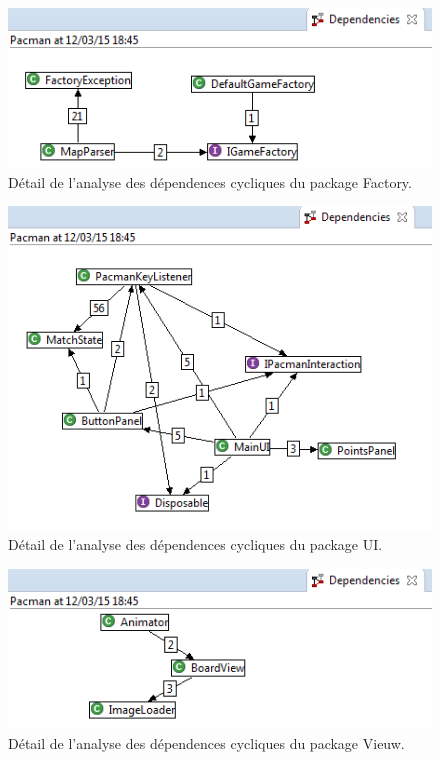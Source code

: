 \documentclass[12pt,a4paper,final]{article}
\begin{document}
\begin{figure}[ht]
	\centering
	\includegraphics[width=\textwidth]{images/DependenciesFactory.png}
	\caption{\label{dependenciesF}Détail de l'analyse des dépendences cycliques du package Factory.}
\end{figure}

\begin{figure}[ht]
	\centering
	\includegraphics[width=\textwidth]{images/DependenciesUI.png}
	\caption{\label{dependenciesUI}Détail de l'analyse des dépendences cycliques du package UI.}
\end{figure}

\begin{figure}[ht]
	\centering
	\includegraphics[width=\textwidth]{images/DependenciesVieuw.png}
	\caption{\label{dependenciesV}Détail de l'analyse des dépendences cycliques du package Vieuw.}
\end{figure}
\end{document}
